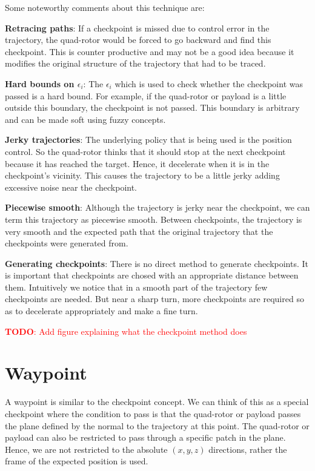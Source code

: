 \documentclass[BTech]{iitmdiss}
\newcommand\todo[1]{\textcolor{red}{{\bf TODO}: #1}}
\begin{document}
Some noteworthy comments about this technique are:

{\bf Retracing paths}: If a checkpoint is missed due to control error in the trajectory, the quad-rotor would be forced to go backward and find this checkpoint. This is counter productive and may not be a good idea because it modifies the original structure of the trajectory that had to be traced.

{\bf Hard bounds on $\epsilon_i$}: The $\epsilon_i$ which is used to check whether the checkpoint was passed is a hard bound. For example, if the quad-rotor or payload is a little outside this boundary, the checkpoint is not passed. This boundary is arbitrary and can be made soft using fuzzy concepts.

{\bf Jerky trajectories}: The underlying policy that is being used is the position control. So the quad-rotor thinks that it should stop at the next checkpoint because it has reached the target. Hence, it decelerate when it is in the checkpoint's vicinity. This causes the trajectory to be a little jerky adding excessive noise near the checkpoint.

{\bf Piecewise smooth}: Although the trajectory is jerky near the checkpoint, we can term this trajectory as piecewise smooth. Between checkpoints, the trajectory is very smooth and the expected path that the original trajectory that the checkpoints were generated from.

{\bf Generating checkpoints}: There is no direct method to generate checkpoints. It is important that checkpoints are chosed with an appropriate distance between them. Intuitively we notice that in a smooth part of the trajectory few checkpoints are needed. But near a sharp turn, more checkpoints are required so as to decelerate appropriately and make a fine turn.

\todo{Add figure explaining what the checkpoint method does}

\section{Waypoint}

A waypoint is similar to the checkpoint concept. We can think of this as a special checkpoint where the condition to pass is that the quad-rotor or payload passes the plane defined by the normal to the trajectory at this point. The quad-rotor or payload can also be restricted to pass through a specific patch in the plane. Hence, we are not restricted to the absolute $(x, y, z)$ directions, rather the frame of the expected position is used.
\end{document}
